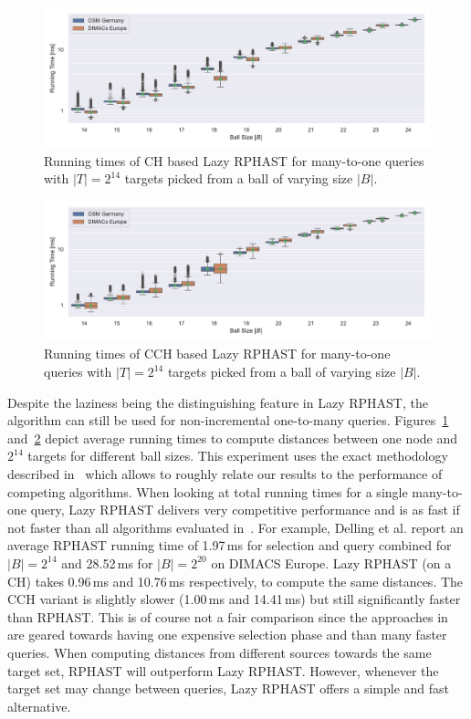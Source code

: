 \documentclass[manuscript,review]{acmart}
\begin{document}
\begin{figure}
\centering
\includegraphics[width=\linewidth]{fig/lazy_rphast_many_to_one.pdf}
\caption{
Running times of CH based Lazy RPHAST for many-to-one queries with $|T| = 2^{14}$ targets picked from a ball of varying size $|B|$.
}\label{fig:many_to_one}
\end{figure}

\begin{figure}
\centering
\includegraphics[width=\linewidth]{fig/lazy_rphast_cch_many_to_one.pdf}
\caption{
Running times of CCH based Lazy RPHAST for many-to-one queries with $|T| = 2^{14}$ targets picked from a ball of varying size $|B|$.
}\label{fig:many_to_one_cch}
\end{figure}

Despite the laziness being the distinguishing feature in Lazy RPHAST, the algorithm can still be used for non-incremental one-to-many queries.
Figures~\ref{fig:many_to_one} and~\ref{fig:many_to_one_cch} depict average running times to compute distances between one node and $2^{14}$ targets for different ball sizes.
This experiment uses the exact methodology described in~\cite{delling_et_al:OASIcs:2011:3266} which allows to roughly relate our results to the performance of competing algorithms.
When looking at total running times for a single many-to-one query, Lazy RPHAST delivers very competitive performance and is as fast if not faster than all algorithms evaluated in~\cite{delling_et_al:OASIcs:2011:3266}.
For example, Delling et al. report an average RPHAST running time of 1.97\,ms for selection and query combined for $|B| = 2^{14}$ and 28.52\,ms for $|B| = 2^{20}$ on DIMACS Europe.
Lazy RPHAST (on a CH) takes 0.96\,ms and 10.76\,ms respectively, to compute the same distances.
The CCH variant is slightly slower (1.00\,ms and 14.41\,ms) but still significantly faster than RPHAST.
This is of course not a fair comparison since the approaches in~\cite{delling_et_al:OASIcs:2011:3266} are geared towards having one expensive selection phase and than many faster queries.
When computing distances from different sources towards the same target set, RPHAST will outperform Lazy RPHAST.
However, whenever the target set may change between queries, Lazy RPHAST offers a simple and fast alternative.
\end{document}
